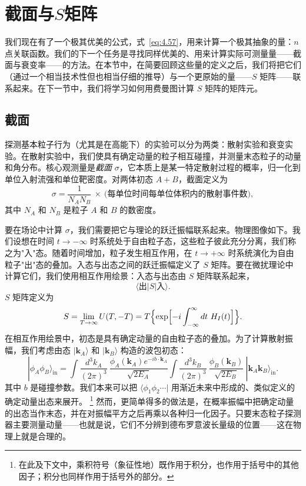 \section{截面与$S$矩阵}

我们现在有了一个极其优美的公式，式~\eqref{eq:4.57}，用来计算一个极其抽象的量：$n$ 点关联函数。我们的下一个任务是寻找同样优美的、用来计算实际可测量量——截面与衰变率——的方法。在本节中，在简要回顾这些量的定义之后，我们将把它们（通过一个相当技术性但也相当仔细的推导）与一个更原始的量——$S$ 矩阵——联系起来。在下一节中，我们将学习如何用费曼图计算 $S$ 矩阵的矩阵元。

\subsection{截面}

探测基本粒子行为（尤其是在高能下）的实验可以分为两类：散射实验和衰变实验。在散射实验中，我们使具有确定动量的粒子相互碰撞，并测量末态粒子的动量和角分布。核心观测量是\emph{截面} $\sigma$，它本质上是某一特定散射过程的概率，归一化到单位入射流强和单位靶密度。对两体初态 $A+B$，截面定义为
\begin{equation}
  \sigma = \frac{1}{N_A N_B}\ \times\ \text{(每单位时间每单位体积内的散射事件数)} ,
  \label{eq:4.59}
\end{equation}
其中 $N_A$ 和 $N_B$ 是粒子 $A$ 和 $B$ 的数密度。

要在场论中计算 $\sigma$，我们需要把它与理论的跃迁振幅联系起来。物理图像如下。我们设想在时间 $t\to-\infty$ 时系统处于自由粒子态，这些粒子彼此充分分离，我们称之为"入"态。随着时间增加，粒子发生相互作用，在 $t\to+\infty$ 时系统演化为自由粒子"出"态的叠加。入态与出态之间的跃迁振幅定义了 $S$ 矩阵。要在微扰理论中计算它们，我们使用相互作用绘景：入态与出态由 $S$ 矩阵联系起来，
\begin{equation}
  \langle \text{出}|S|\text{入}\rangle .
  \label{eq:4.60}
\end{equation}
$S$ 矩阵定义为
\begin{equation}
  S = \lim_{T\to\infty} U(T, -T)
    = T\Bigl\{ \exp\Bigl[ -i\int_{-\infty}^{\infty}dt\ H_I(t) \Bigr] \Bigr\} .
  \label{eq:4.61}
\end{equation}
在相互作用绘景中，初态是具有确定动量的自由粒子态的叠加。为了计算散射振幅，我们考虑由态 $|\mathbf{k}_A\rangle$ 和 $|\mathbf{k}_B\rangle$ 构造的波包初态：
\begin{equation}
  |\phi_A\phi_B\rangle_{\mathrm{in}} = \int
    \frac{d^3k_A}{(2\pi)^3}\ \frac{\phi_A(\mathbf{k}_A)e^{-ib\cdot\mathbf{k}_A}}
      {\sqrt{2E_A}}
    \int \frac{d^3k_B}{(2\pi)^3}\ \frac{\phi_B(\mathbf{k}_B)}
      {\sqrt{2E_B}}\ |\mathbf{k}_A\mathbf{k}_B\rangle_{\mathrm{in}} .
  \label{eq:4.68}
\end{equation}
其中 $b$ 是碰撞参数。我们本来可以把 $\langle\phi_1\phi_2\cdots|$ 用渐近未来中形成的、类似定义的确定动量出态来展开。%
\footnote{在此及下文中，乘积符号（象征性地）既作用于积分，也作用于括号中的其他因子；积分也同样作用于括号外的部分。}
然而，更简单得多的做法是，在概率振幅中把确定动量的出态当作末态，并在对振幅平方之后再乘以各种归一化因子。只要末态粒子探测器主要测量动量——也就是说，它们不分辨到德布罗意波长量级的位置——这在物理上就是合理的。

